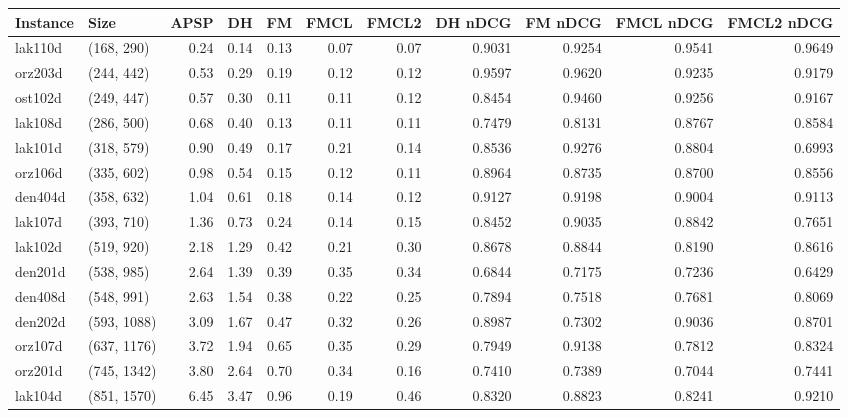 \begin{tabular}{llrrrrrrrrr}
\toprule
Instance &         Size &   APSP &     DH &    FM &  FMCL &  FMCL2 &  DH nDCG &  FM nDCG &  FMCL nDCG &  FMCL2 nDCG \\
\midrule
 lak110d &   (168, 290) &   0.24 &   0.14 &  0.13 &  0.07 &   0.07 &   0.9031 &   0.9254 &     0.9541 &      0.9649 \\
 orz203d &   (244, 442) &   0.53 &   0.29 &  0.19 &  0.12 &   0.12 &   0.9597 &   0.9620 &     0.9235 &      0.9179 \\
 ost102d &   (249, 447) &   0.57 &   0.30 &  0.11 &  0.11 &   0.12 &   0.8454 &   0.9460 &     0.9256 &      0.9167 \\
 lak108d &   (286, 500) &   0.68 &   0.40 &  0.13 &  0.11 &   0.11 &   0.7479 &   0.8131 &     0.8767 &      0.8584 \\
 lak101d &   (318, 579) &   0.90 &   0.49 &  0.17 &  0.21 &   0.14 &   0.8536 &   0.9276 &     0.8804 &      0.6993 \\
 orz106d &   (335, 602) &   0.98 &   0.54 &  0.15 &  0.12 &   0.11 &   0.8964 &   0.8735 &     0.8700 &      0.8556 \\
 den404d &   (358, 632) &   1.04 &   0.61 &  0.18 &  0.14 &   0.12 &   0.9127 &   0.9198 &     0.9004 &      0.9113 \\
 lak107d &   (393, 710) &   1.36 &   0.73 &  0.24 &  0.14 &   0.15 &   0.8452 &   0.9035 &     0.8842 &      0.7651 \\
 lak102d &   (519, 920) &   2.18 &   1.29 &  0.42 &  0.21 &   0.30 &   0.8678 &   0.8844 &     0.8190 &      0.8616 \\
 den201d &   (538, 985) &   2.64 &   1.39 &  0.39 &  0.35 &   0.34 &   0.6844 &   0.7175 &     0.7236 &      0.6429 \\
 den408d &   (548, 991) &   2.63 &   1.54 &  0.38 &  0.22 &   0.25 &   0.7894 &   0.7518 &     0.7681 &      0.8069 \\
 den202d &  (593, 1088) &   3.09 &   1.67 &  0.47 &  0.32 &   0.26 &   0.8987 &   0.7302 &     0.9036 &      0.8701 \\
 orz107d &  (637, 1176) &   3.72 &   1.94 &  0.65 &  0.35 &   0.29 &   0.7949 &   0.9138 &     0.7812 &      0.8324 \\
 orz201d &  (745, 1342) &   3.80 &   2.64 &  0.70 &  0.34 &   0.16 &   0.7410 &   0.7389 &     0.7044 &      0.7441 \\
 lak104d &  (851, 1570) &   6.45 &   3.47 &  0.96 &  0.19 &   0.46 &   0.8320 &   0.8823 &     0.8241 &      0.9210 \\

\end{tabular}
